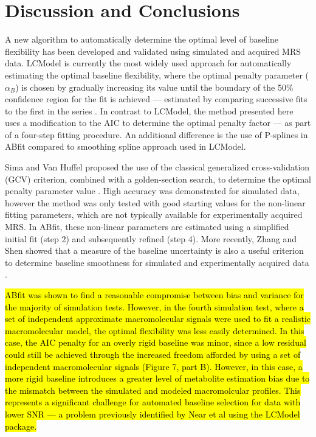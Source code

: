 \documentclass[num-refs]{wiley-article}
\newcommand{\revone}[2]{\hl{#1}\marginnote{\hl{#2}}}
\begin{document}
\section{Discussion and Conclusions}
A new algorithm to automatically determine the optimal level of baseline flexibility has been developed and validated using simulated and acquired MRS data. LCModel is currently the most widely used approach for automatically estimating the optimal baseline flexibility, where the optimal penalty parameter ($\alpha_{B}$) is chosen by gradually increasing its value until the boundary of the 50\% confidence region for the fit is achieved --- estimated by comparing successive fits to the first in the series \cite{Provencher1982, Provencher1993}. In contrast to LCModel, the method presented here uses a modification to the AIC to determine the optimal penalty factor --- as part of a four-step fitting procedure. An additional difference is the use of P-splines in ABfit compared to smoothing spline approach \cite{OSullivan1986} used in LCModel.

Sima and Van Huffel proposed the use of the classical generalized cross-validation (GCV) criterion, combined with a golden-section search, to determine the optimal penalty parameter value \cite{Sima2006}. High accuracy was demonstrated for simulated data, however the method was only tested with good starting values for the non-linear fitting parameters, which are not typically available for experimentally acquired MRS. In ABfit, these non-linear parameters are estimated using a simplified initial fit (step 2) and subsequently refined (step 4). More recently, Zhang and Shen showed that a measure of the baseline uncertainty is also a useful criterion to determine baseline smoothness for simulated and experimentally acquired data \cite{Zhang2014}.

\revone{ABfit was shown to find a reasonable compromise between bias and variance for the majority of simulation tests. However, in the fourth simulation test, where a set of independent approximate macromolecular signals were used to fit a realistic macromolecular model, the optimal flexibility was less easily determined. In this case, the AIC penalty for an overly rigid baseline was minor, since a low residual could still be achieved through the increased freedom afforded by using a set of independent macromolecular signals (Figure 7, part B). However, in this case, a more rigid baseline introduces a greater level of metabolite estimation bias due to the mismatch between the simulated and modeled macromolcular profiles. This represents a significant challenge for automated baseline selection for data with lower SNR --- a problem previously identified by Near et al \cite{Near2013} using the LCModel package.}{R1.28}
\end{document}
